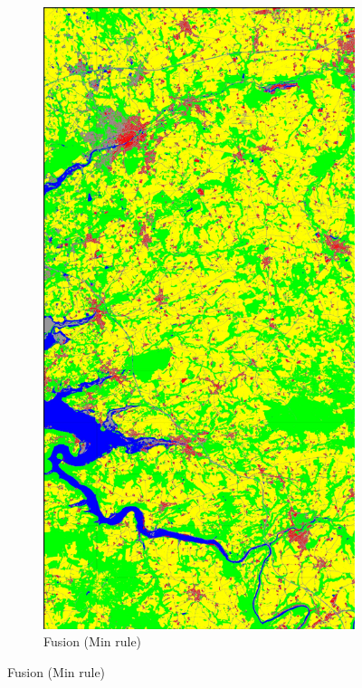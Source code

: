 \documentclass[10pt]{article}
\begin{document}
\begin{appendices}
\begin{figure}[H]
    \centering 
    \begin{subfigure}{0.49\textwidth}
        \centering
        \includegraphics[width=\textwidth]{all_classif_Fusion_Min_weighted}
        \caption{Fusion (Min rule)}

\end{subfigure}
\end{figure}
\end{appendices}
\end{document}

